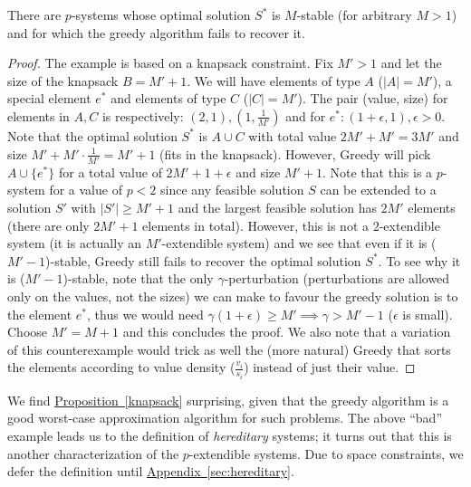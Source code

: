\begin{proposition} \label{knapsack}
There are $p$-systems whose optimal solution $S^*$ is $M$-stable (for arbitrary $M>1$) and for which the greedy algorithm fails to recover it.
\end{proposition}

\begin{proof}
The example is based on a knapsack constraint. Fix $M'>1$ and let the size of the knapsack $B=M'+1$. We will have elements of type $A$ ($|A|=M'$), a special element $e^*$ and elements of type $C$ ($|C|=M'$). The pair (value, size) for elements in $A,C$ is respectively: $(2,1),(1,\tfrac{1}{M'})$ and for $e^*: (1+\epsilon,1), \epsilon>0$. Note that the optimal solution $S^*$ is $A\cup C$ with total value $2M'+M'=3M'$ and size $M'+M'\cdot\tfrac{1}{M'}=M'+1$ (fits in the knapsack). However, Greedy will pick $A\cup\{e^*\}$ for a total value of $2M'+1+\epsilon$ and size $M'+1$. Note that this is a $p$-system for a value of $p<2$ since any feasible solution $S$ can be extended to a solution $S'$ with $|S'|\ge M'+1$ and the largest feasible solution has $2M'$ elements (there are only $2M'+1$ elements in total). However, this is not a $2$-extendible system (it is actually an $M'$-extendible system) and we see that even if it is ($M'-1$)-stable, Greedy still fails to recover the optimal solution $S^*$. To see why it is ($M'-1$)-stable, note that the only $\gamma$-perturbation (perturbations are allowed only on the values, not the sizes) we can make to favour the greedy solution is to the element $e^*$, thus we would need $\gamma(1+\epsilon)\ge M' \implies \gamma>M'-1$ ($\epsilon$ is small). Choose $M'=M+1$ and this concludes the proof. We also note that a variation of this counterexample would trick as well the (more natural) Greedy that sorts the elements according to value density ($\tfrac{v_i}{s_i}$) instead of just their value.
\end{proof}

We find \hyperref[knapsack]{Proposition~\ref{knapsack}} surprising, given that the greedy
algorithm is a good worst-case approximation algorithm for such
problems. The above ``bad'' example leads us to the definition of \textit{hereditary} systems; it turns out that this is another characterization of the $p$-extendible systems. Due to space constraints, we defer the definition until \hyperref[sec:hereditary]{Appendix~\ref{sec:hereditary}}.


